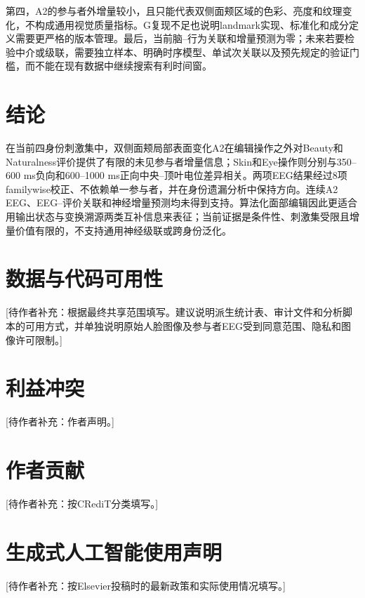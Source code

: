 \documentclass[preprint,12pt,authoryear]{elsarticle}
\newcommand{\todo}[1]{\textcolor{red!70!black}{[待作者补充：#1]}}
\begin{document}
第四，A2的参与者外增量较小，且只能代表双侧面颊区域的色彩、亮度和纹理变化，不构成通用视觉质量指标。G复现不足也说明landmark实现、标准化和成分定义需要更严格的版本管理。最后，当前脑--行为关联和增量预测为零；未来若要检验中介或级联，需要独立样本、明确时序模型、单试次关联以及预先规定的验证门槛，而不能在现有数据中继续搜索有利时间窗。

\section{结论}

在当前四身份刺激集中，双侧面颊局部表面变化A2在编辑操作之外对Beauty和Naturalness评价提供了有限的未见参与者增量信息；Skin和Eye操作则分别与350--600 ms负向和600--1000 ms正向中央--顶叶电位差异相关。两项EEG结果经过8项familywise校正、不依赖单一参与者，并在身份遗漏分析中保持方向。连续A2 EEG、EEG--评价关联和神经增量预测均未得到支持。算法化面部编辑因此更适合用输出状态与变换溯源两类互补信息来表征；当前证据是条件性、刺激集受限且增量价值有限的，不支持通用神经级联或跨身份泛化。

\section*{数据与代码可用性}

\todo{根据最终共享范围填写。建议说明派生统计表、审计文件和分析脚本的可用方式，并单独说明原始人脸图像及参与者EEG受到同意范围、隐私和图像许可限制。}

\section*{利益冲突}

\todo{作者声明。}

\section*{作者贡献}

\todo{按CRediT分类填写。}

\section*{生成式人工智能使用声明}

\todo{按Elsevier投稿时的最新政策和实际使用情况填写。}



\end{document}
